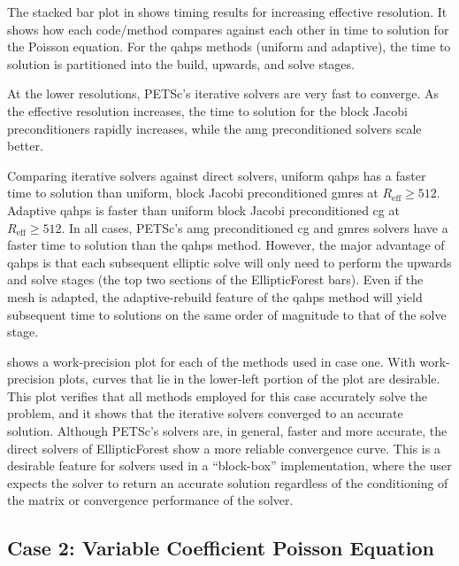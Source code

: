 The stacked bar plot in  shows timing results for increasing effective resolution. It shows how each code/method compares against each other in time to solution for the Poisson equation. For the \gls{qahps} methods (uniform and adaptive), the time to solution is partitioned into the build, upwards, and solve stages.

At the lower resolutions, PETSc's iterative solvers are very fast to converge. As the effective resolution increases, the time to solution for the block Jacobi preconditioners rapidly increases, while the \gls{amg} preconditioned solvers scale better.

Comparing iterative solvers against direct solvers, uniform \gls{qahps} has a faster time to solution than uniform, block Jacobi preconditioned \gls{gmres} at $R_{\text{eff}} \ge 512$. Adaptive \gls{qahps} is faster than uniform block Jacobi preconditioned \gls{cg} at $R_{\text{eff}} \ge 512$. In all cases, PETSc's \gls{amg} preconditioned \gls{cg} and \gls{gmres} solvers have a faster time to solution than the \gls{qahps} method. However, the major advantage of \gls{qahps} is that each subsequent elliptic solve will only need to perform the upwards and solve stages (the top two sections of the EllipticForest bars). Even if the mesh is adapted, the adaptive-rebuild feature of the \gls{qahps} method will yield subsequent time to solutions on the same order of magnitude to that of the solve stage.

 shows a work-precision plot for each of the methods used in case one. With work-precision plots, curves that lie in the lower-left portion of the plot are desirable. This plot verifies that all methods employed for this case accurately solve the problem, and it shows that the iterative solvers converged to an accurate solution. Although PETSc's solvers are, in general, faster and more accurate, the direct solvers of EllipticForest show a more reliable convergence curve. This is a desirable feature for solvers used in a ``block-box'' implementation, where the user expects the solver to return an accurate solution regardless of the conditioning of the matrix or convergence performance of the solver.

\subsection{Case 2: Variable Coefficient Poisson Equation}
\label{sub:case2}

